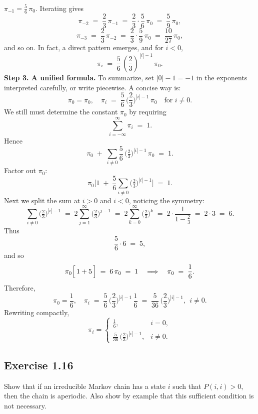 \documentclass{article}
\begin{document}
{$\pi_{-1} = \tfrac{5}{6}\,\pi_0$. Iterating gives
\[
\pi_{-2} 
\;=\; 
\frac{2}{3}\,\pi_{-1}
\;=\;
\frac{2}{3} \cdot \frac{5}{6}\,\pi_0 
\;=\; 
\frac{5}{9}\,\pi_0,
\]
\[
\pi_{-3} 
\;=\; 
\frac{2}{3}\,\pi_{-2}
\;=\; 
\frac{2}{3}\cdot \frac{5}{9}\,\pi_0 
\;=\; 
\frac{10}{27}\,\pi_0,
\]
and so on. In fact, a direct pattern emerges, and for $i<0$,
\[
\pi_i 
\;=\;
\frac{5}{6}\,\left(\frac{2}{3}\right)^{\,|i|-1}\,\pi_0.
\]
\medskip
\textbf{Step 3. A unified formula.}
To summarize, set $|0|-1 = -1$ in the exponents interpreted carefully, or write piecewise.  A concise way is:
\[
\pi_0 = \pi_0,
\quad
\pi_i 
\;=\;
\frac{5}{6} \,\biggl(\frac{2}{3}\biggr)^{|i|-1}\,\pi_0 
\quad
\text{for } i \neq 0.
\]
We still must determine the constant $\pi_0$ by requiring
\[
\sum_{i=-\infty}^{\infty} \pi_i \;=\; 1.
\]
Hence
\[
\pi_0 
\;+\;
\sum_{i\neq 0} \frac{5}{6} \,\biggl(\tfrac{2}{3}\biggr)^{|i|-1}\,\pi_0
\;=\; 1.
\]
Factor out $\pi_0$:
\[
\pi_0 
\biggl[
1 
\;+\; 
\frac{5}{6}\sum_{i\neq 0}\bigl(\tfrac{2}{3}\bigr)^{|i|-1}
\biggr]
\;=\; 1.
\]
Next we split the sum at $i>0$ and $i<0$, noticing the symmetry:
\[
\sum_{i\neq 0}\bigl(\tfrac{2}{3}\bigr)^{|i|-1} 
\;=\;
2 \sum_{j=1}^{\infty} \bigl(\tfrac{2}{3}\bigr)^{j-1}
\;=\;
2 \sum_{k=0}^{\infty} \bigl(\tfrac{2}{3}\bigr)^{k}
\;=\;
2 \cdot \frac{1}{1 - \tfrac{2}{3}}
\;=\;
2 \cdot 3
\;=\;
6.
\]
Thus
\[
\frac{5}{6} \cdot 6
\;=\;
5,
\]
and so
\[
\pi_0 \Bigl[\,1 + 5\,\Bigr] 
\;=\;
6\,\pi_0
\;=\;
1 
\quad\Longrightarrow\quad
\pi_0 
\;=\; 
\frac{1}{6}.
\]
Therefore,
\[
\pi_0 = \frac{1}{6},
\quad
\pi_i 
\;=\;
\frac{5}{6}\,\biggl(\frac{2}{3}\biggr)^{|i|-1}\,\frac{1}{6}
\;=\;
\frac{5}{36}\,\biggl(\frac{2}{3}\biggr)^{|i|-1},
\ \ i \neq 0.
\]
Rewriting compactly,
\[
\pi_i
=
\begin{cases}
\displaystyle \frac{1}{6}, 
& i=0,\\[6pt]
\displaystyle \frac{5}{36}\,\bigl(\tfrac{2}{3}\bigr)^{|i|-1},
& i \neq 0.
\end{cases}
\]
}


\subsection*{Exercise 1.16} Show that if an irreducible Markov chain has a state $i$ such that $P(i, i) > 0$, then the chain
is aperiodic. Also show by example that this sufficient condition is not necessary.
\end{document}
